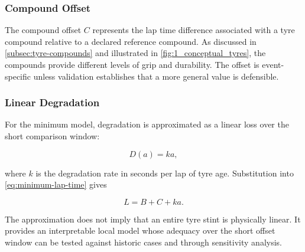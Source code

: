 
\subsubsection{Compound Offset}

The compound offset $C$ represents the lap time difference associated with a
tyre compound relative to a declared reference compound. As discussed in
\cref{subsec:tyre-compounds} and illustrated in
\cref{fig:1_conceptual_tyres}, the compounds provide different levels of grip
and durability. The offset is event-specific unless validation establishes
that a more general value is defensible.


\subsubsection{Linear Degradation}

For the minimum model, degradation is approximated as a linear loss over the
short comparison window:

\begin{equation}
D(a)=ka,
\label{eq:linear-degradation}
\end{equation}

where $k$ is the degradation rate in seconds per lap of tyre age. Substitution
into \cref{eq:minimum-lap-time} gives

\begin{equation}
L=B+C+ka.
\label{eq:model-plus-tyre-degradation}
\end{equation}

The approximation does not imply that an entire tyre stint is physically
linear. It provides an interpretable local model whose adequacy over the short
offset window can be tested against historic cases and through sensitivity
analysis.


